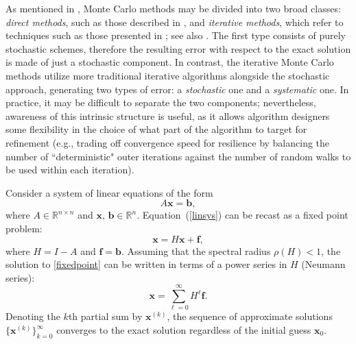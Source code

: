 \documentclass[times]{nlaauth}
\begin{document}
As mentioned in \cite{DA1998}, Monte Carlo methods may be divided into two broad
classes: \textit{direct methods}, such as those described in \cite{DA1998,DVA2001}, and
\textit{iterative methods}, which refer to techniques such as those presented
in \cite{Hal1962,Hal1994}; see also \cite{EMSH2014,ESW2013}.
The first type consists of purely stochastic schemes,
therefore the resulting error with respect to the exact solution is made of
just a stochastic component. In contrast, the iterative Monte Carlo methods utilize more
traditional iterative algorithms alongside the stochastic approach,
generating two types of error: a
\textit{stochastic} one and a \textit{systematic} one.
In practice, it may be difficult to separate the two components;
nevertheless, awareness of this intrinsic structure is useful, as it allows
algorithm designers some flexibility in the choice of what part of the algorithm
to target for refinement (e.g., trading off convergence speed for resilience by
balancing the number of ``deterministic" outer iterations
against the number of random walks to be used within each iteration).

Consider a system of linear equations of the form
\begin{equation}
A \mathbf{x}=\mathbf{b},
\label{linsys}
\end{equation}
where $A\in \mathbb{R}^{n\times n}$ and $\mathbf{x}$, $\mathbf{b} \in
\mathbb{R}^n$.
Equation~(\ref{linsys}) can be recast as a fixed point problem:
\begin{equation}
 \mathbf{x}=H\mathbf{x}+\mathbf{f},
 \label{fixedpoint}
\end{equation}
where $H=I-A$ and $\mathbf{f}=\mathbf{b}$.
Assuming that the spectral radius $\rho(H)<1$, the solution to
\eqref{fixedpoint} can be written in terms of a power series in
$H$ (Neumann series):
\[
\mathbf{x}=\sum_{\ell=0}^\infty H^\ell\mathbf{f}.
\]
Denoting the $k$th partial sum by $\mathbf{x}^{(k)}$, the sequence of approximate solutions
$\{\mathbf{x}^{(k)}\}_{k=0}^{\infty}$ converges to the exact solution
regardless of the initial guess $\mathbf{x}_0$.
\end{document}
